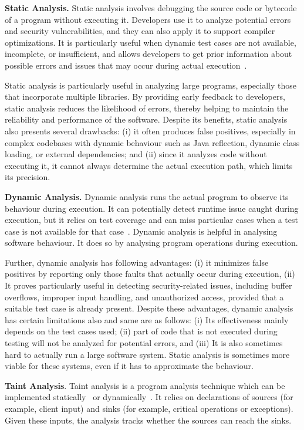 \textbf{Static Analysis.} Static analysis involves debugging the source code or bytecode
of a program without executing it. Developers use it to analyze potential errors and
security vulnerabilities, and they can also apply it to support compiler optimizations.
It is particularly useful when dynamic test cases are not available,
incomplete, or insufficient, and allows developers to get prior information about possible
errors and issues that may occur during actual execution~\cite{Rahaman2023}.

Static analysis is particularly useful in analyzing large programs, especially those that
incorporate multiple libraries. By providing early feedback to developers,
static analysis reduces the likelihood of errors, thereby helping to maintain the reliability
and performance of the software. Despite its benefits, static analysis also presents several
drawbacks: (i) it often produces false positives, especially in complex codebases with dynamic
behaviour such as Java reflection, dynamic class loading, or external dependencies; and (ii)
since it analyzes code without executing it, it cannot always determine the actual execution
path, which limits its precision.

\textbf{Dynamic Analysis.} Dynamic analysis runs the actual program to observe its
behaviour during execution. It can potentially detect runtime issue caught
during execution, but it relies on test coverage and can miss particular cases when a test
case is not available for that case~\cite{Kuliamin2024}. Dynamic analysis is helpful in analysing software
behaviour. It does so by analysing program operations during execution.

Further, dynamic analysis has following advantages: (i) it minimizes false positives by reporting only those faults that actually
occur during execution, (ii) It proves particularly useful in detecting security-related issues,
including buffer overflows, improper input handling, and unauthorized access, provided that a
suitable test case is already present. Despite these advantages, dynamic analysis has certain limitations
also and same are as follows: (i) Its effectiveness mainly depends on the test cases used;
(ii) part of code that is not executed during testing will not be analyzed for potential
errors, and (iii) It is also sometimes hard to actually run a large software system. Static
analysis is sometimes more viable for these systems, even if it has to approximate the behaviour.

\textbf{Taint Analysis}. Taint analysis is a program analysis technique which can be implemented statically~\cite{myers99:_jflow} or dynamically~\cite{newsome05:_dynam}.
It relies on declarations of sources (for example, client input) and sinks (for example, critical
operations or exceptions). Given these inputs, the analysis tracks whether the sources can reach the sinks.

